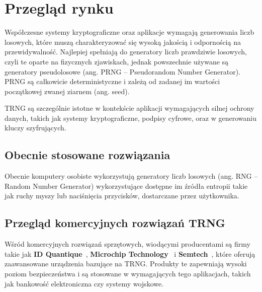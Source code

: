 \chapter{Przegląd rynku}\label{ch:przeglad-rynku}

Współczesne systemy kryptograficzne oraz aplikacje wymagają generowania liczb losowych,
które muszą charakteryzować się wysoką jakością i odpornością na przewidywalność.
Najlepiej spełniają do generatory liczb prawdziwie losowych, czyli te oparte na fizycznych zjawiskach,
jednak powszechnie używane są generatory pseudolosowe (ang. PRNG -- Pseudorandom Number Generator).
PRNG są całkowicie deterministyczne i zależą od zadanej im wartości początkowej zwanej ziarnem (ang. seed).

TRNG są szczególnie istotne w kontekście aplikacji wymagających silnej ochrony danych,
takich jak systemy kryptograficzne, podpisy cyfrowe, oraz w generowaniu kluczy szyfrujących.

\section{Obecnie stosowane rozwiązania}\label{sec:obecnie-stosowane-rozwiazania}

Obecnie komputery osobiste wykorzystują generatory liczb losowych (ang. RNG -- Random Number Generator)
wykorzystujące dostępne im źródła entropii takie jak ruchy myszy lub naciśnięcia przycisków, dostarczane przez użytkownika.

\section{Przegląd komercyjnych rozwiązań TRNG}\label{sec:przeglad-komercyjnych-rozwiazan-trng}

Wśród komercyjnych rozwiązań sprzętowych, wiodącymi producentami są firmy takie jak
\textbf{ID Quantique}~\cite{IDQ}, \textbf{Microchip Technology}~\cite{MicrochipTechnology} i \textbf{Semtech}~\cite{Semtech},
które oferują zaawansowane urządzenia bazujące na TRNG.
Produkty te zapewniają wysoki poziom bezpieczeństwa i są stosowane w wymagających tego aplikacjach,
takich jak bankowość elektroniczna czy systemy wojskowe.


